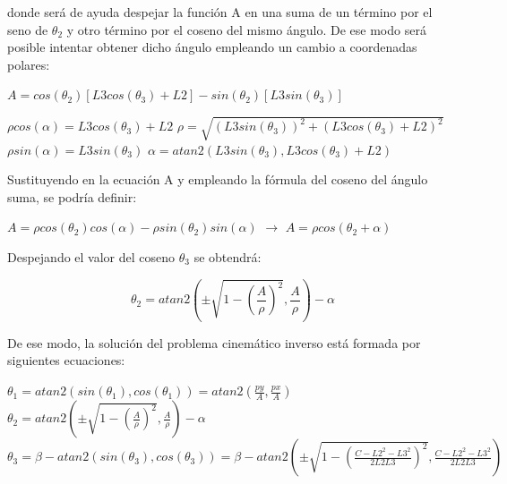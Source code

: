 donde será de ayuda despejar la función A en una suma de un término por el seno de $ \theta_{2}$ y otro término por el coseno del mismo ángulo. De ese modo será posible intentar obtener dicho ángulo empleando un cambio a coordenadas polares:

\begin{center}
	
	$A=cos(\theta_{2})[L3cos(\theta_{3})+L2]-sin(\theta_{2})[L3sin(\theta_{3})]$\\
	
	\vspace{0.3cm}
	
		
		\begin{center}
			
			$\rho cos(\alpha)=L3cos(\theta_{3})+L2$ \hspace*{3cm} $\rho=\sqrt{(L3sin(\theta_{3}))^{2}+(L3cos(\theta_{3})+L2)^{2}} $\\
			
			$\rho sin(\alpha)=L3sin(\theta_{3})$ \hspace*{3.8cm} $\alpha=atan2(L3sin(\theta_{3}),L3cos(\theta_{3})+L2)$\\
			
		\end{center}
		

\end{center}

Sustituyendo en la ecuación A y empleando la fórmula del coseno del ángulo suma, se podría definir:\\

\begin{center}
	
	$A=\rho cos(\theta_{2})cos(\alpha)-\rho sin(\theta_{2})sin(\alpha)$ $\rightarrow$ $A=\rho cos(\theta_{2}+\alpha)$
	
\end{center}



Despejando el valor del coseno $\theta_{3}$ se obtendrá:

\begin{equation}
\theta_{2}=atan2(\pm \sqrt{1-(\frac{A}{\rho})^{2}},\frac{A}{\rho})-\alpha
\end{equation}

De ese modo, la solución del problema cinemático inverso está formada por siguientes ecuaciones:

\begin{center}
	
	$\theta_{1}=atan2(sin(\theta_{1}),cos(\theta_{1}))=atan2(\frac{py}{A},\frac{px}{A})$ \\
	
	$\theta_{2}=atan2(\pm \sqrt{1-(\frac{A}{\rho})^{2}},\frac{A}{\rho})-\alpha$ \\
	
	$\theta_{3}=\beta -atan2(sin(\theta_{3}),cos(\theta_{3}))=\beta-atan2(\pm \sqrt{1-(\frac{C-L2^{2}-L3^{2}}{2L2L3})^{2}},\frac{C-L2^{2}-L3^{2}}{2L2L3} )$
	
\end{center}



